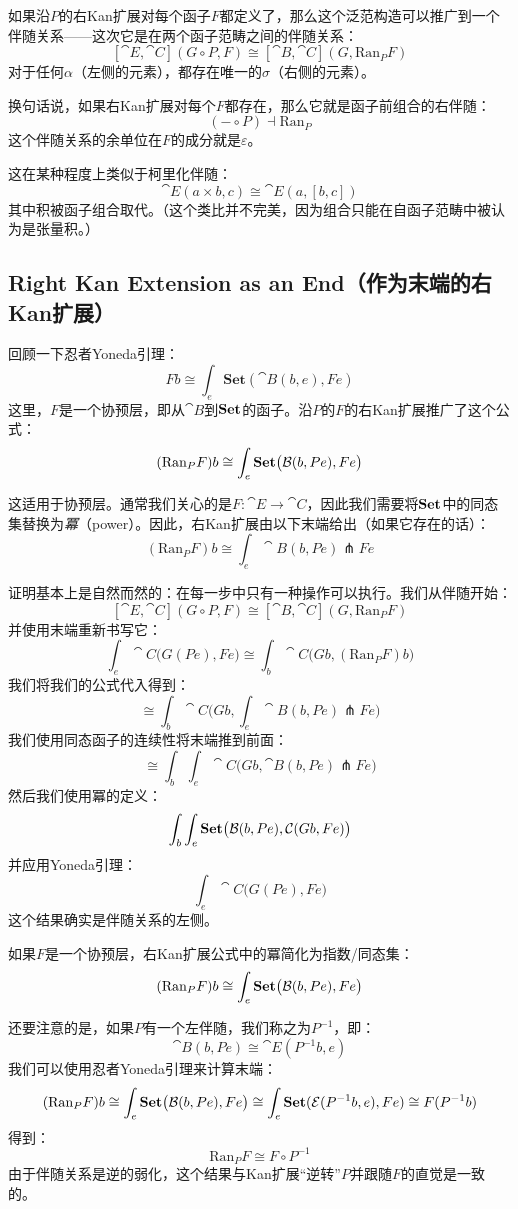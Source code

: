 \documentclass[DaoFP]{subfiles}
\begin{document}
 如果沿$P$的右Kan扩展对每个函子$F$都定义了，那么这个泛范构造可以推广到一个伴随关系——这次它是在两个函子范畴之间的伴随关系：
 \[ [\cat E, \cat C](G \circ P, F) \cong [\cat B, \cat C](G, \text{Ran}_P F) \]
 对于任何$\alpha$（左侧的元素），都存在唯一的$\sigma$（右侧的元素）。

 换句话说，如果右Kan扩展对每个$F$都存在，那么它就是函子前组合的右伴随：
 \[ (- \circ P) \dashv \text{Ran}_P \]
 这个伴随关系的余单位在$F$的成分就是$\varepsilon$。

 这在某种程度上类似于柯里化伴随：
 \[ \cat E (a \times b, c) \cong \cat E (a, [b, c]) \]
 其中积被函子组合取代。（这个类比并不完美，因为组合只能在自函子范畴中被认为是张量积。）

 \subsection{Right Kan Extension as an End（作为末端的右Kan扩展）}

 回顾一下忍者Yoneda引理：
 \[ F b \cong \int_{e} \mathbf{Set} (\cat B(b, e), F e) \]
 这里，$F$是一个协预层，即从$\cat B$到$\mathbf{Set}$的函子。沿$P$的$F$的右Kan扩展推广了这个公式：
 \[ (\text{Ran}_P F) b \cong \int_e \mathbf{Set} \big( \mathcal{B} (b, P e), F e\big) \]

 这适用于协预层。通常我们关心的是$F \colon \cat E \to \cat C$，因此我们需要将$\mathbf{Set}$中的同态集替换为\emph{冪}（power）。因此，右Kan扩展由以下末端给出（如果它存在的话）：
 \[ (\text{Ran}_P F) b \cong \int_e \cat B (b, P e) \pitchfork F e \]

 证明基本上是自然而然的：在每一步中只有一种操作可以执行。我们从伴随开始：
 \[ [\cat E, \cat C](G \circ P, F) \cong [\cat B, \cat C](G, \text{Ran}_P F) \]
 并使用末端重新书写它：
 \[ \int_e \cat C \big(G ( P e), F e\big) \cong \int_b \cat C\big(G b, (\text{Ran}_P F) b\big) \]
 我们将我们的公式代入得到：
 \[ \cong  \int_b \cat C\big(G b,\int_e \cat B (b, P e) \pitchfork F e \big)\]
 我们使用同态函子的连续性将末端推到前面：
 \[  \cong  \int_b \int_e \cat C\big(G b, \cat B (b, P e) \pitchfork F e \big) \]
 然后我们使用冪的定义：
 \[ \int_b \int_e \mathbf{Set} \big(  \mathcal{B} (b, P e), \mathcal{C} (G b, F e) \big) \]
 并应用Yoneda引理：
 \[ \int_e  \cat C \big(G (P e), F e\big) \]
 这个结果确实是伴随关系的左侧。

 如果$F$是一个协预层，右Kan扩展公式中的冪简化为指数/同态集：
 \[ (\text{Ran}_P F) b \cong \int_e \mathbf{Set} \big( \mathcal{B} (b, P e), F e\big) \]

 还要注意的是，如果$P$有一个左伴随，我们称之为$P^{-1}$，即：
 \[ \cat B(b, P e) \cong \cat E(P^{-1} b, e) \]
 我们可以使用忍者Yoneda引理来计算末端：
 \[ (\text{Ran}_P F) b \cong \int_e \mathbf{Set} \big( \mathcal{B} (b, P e), F e\big) \cong \int_e \mathbf{Set}(\mathcal{E}(P^{-1} b, e), F e) \cong F(P^{-1} b)\]
 得到：
 \[  \text{Ran}_P F \cong F \circ P^{-1} \]
 由于伴随关系是逆的弱化，这个结果与Kan扩展“逆转”$P$并跟随$F$的直觉是一致的。
 
\end{document}

